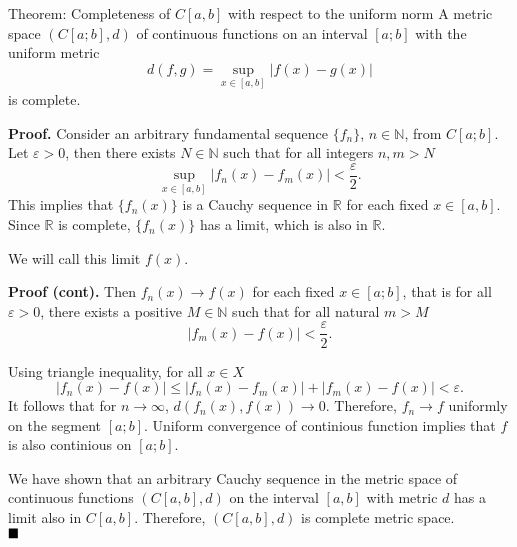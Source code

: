 \documentclass[10pt]{beamer}
\renewcommand{\qed}{\hfill\blacksquare}
\begin{document}
\begin{frame}
  \begin{block}{Theorem: Completeness of \(C[a,b]\) with respect to the uniform norm}
    A metric space \((C[a;b], d)\) of continuous functions on an interval \([a; b]\)
    with the uniform metric
    \[d(f, g) = \sup_{x \in [a,b]}|f(x) - g(x)|\]
    is complete.
  \end{block}

  \textbf{Proof.} Consider an arbitrary fundamental sequence \(\{f_n\}\), \(n \in \mathbb{N}\), from \(C[a;b]\).
  Let \(\varepsilon > 0\), then there exists \(N \in \mathbb{N}\) such that for all integers \(n, m > N\)
  \[\sup_{x \in [a,b]}|f_n(x) - f_m(x)| < \frac{\varepsilon}{2}.\]
  This implies that \(\{f_n(x)\}\) is a Cauchy sequence in \(\mathbb{R}\) for each fixed \(x \in [a, b]\).
  Since \(\mathbb{R}\) is complete, \(\{f_n(x)\}\) has a limit, which is also in \(\mathbb{R}\).
  \vspace{0.3cm}

  We will call this limit \(f(x)\).
\end{frame}

\begin{frame}
  \textbf{Proof (cont).} Then \(f_n(x) \rightarrow f(x)\) for each fixed \(x \in [a;b]\), that is
  for all \(\varepsilon > 0\), there exists a positive \(M \in \mathbb{N}\) such that for all natural \(m > M\)
  \[|f_m(x) - f(x)| < \frac{\varepsilon}{2}.\]

  Using triangle inequality, for all \(x \in X\)
  \[|f_n(x) - f(x)| \le |f_n(x) - f_m(x)| + |f_m(x) - f(x)| < \varepsilon.\]
  It follows that for \(n \rightarrow \infty\), \(d(f_n(x), f(x)) \rightarrow 0\).
  Therefore, \(f_n \rightarrow f\) uniformly on the segment \([a;b]\). Uniform convergence of
  continious function implies that \(f\) is also continious on \([a;b]\).
  \vspace{0.3cm}

  We have shown that an arbitrary Cauchy sequence in the metric space of continuous functions \((C[a, b], d)\)
  on the interval \([a, b]\) with metric \(d\) has a limit also in \(C[a, b]\). Therefore, \((C[a, b], d)\) is
  complete metric space. \\ \(\qed\)
\end{frame}
\end{document}
